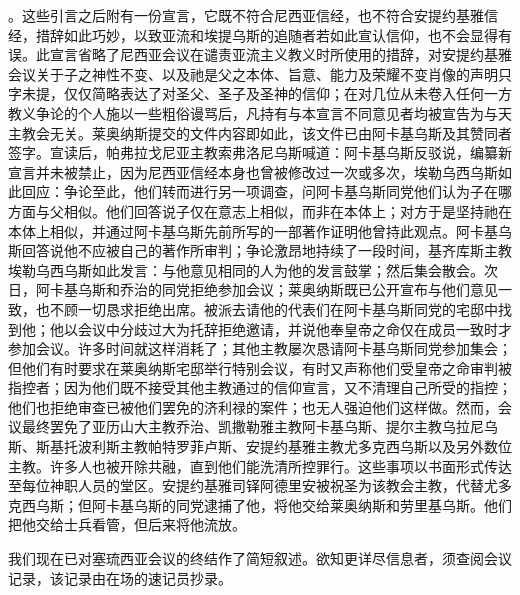。这些引言之后附有一份宣言，它既不符合尼西亚信经，也不符合安提约基雅信经，措辞如此巧妙，以致亚流和埃提乌斯的追随者若如此宣认信仰，也不会显得有误。此宣言省略了尼西亚会议在谴责亚流主义教义时所使用的措辞，对安提约基雅会议关于子之神性不变、以及祂是父之本体、旨意、能力及荣耀不变肖像的声明只字未提，仅仅简略表达了对圣父、圣子及圣神的信仰；在对几位从未卷入任何一方教义争论的个人施以一些粗俗谩骂后，凡持有与本宣言不同意见者均被宣告为与天主教会无关。莱奥纳斯提交的文件内容即如此，该文件已由阿卡基乌斯及其赞同者签字。宣读后，帕弗拉戈尼亚主教索弗洛尼乌斯喊道：阿卡基乌斯反驳说，编纂新宣言并未被禁止，因为尼西亚信经本身也曾被修改过一次或多次，埃勒乌西乌斯如此回应：争论至此，他们转而进行另一项调查，问阿卡基乌斯同党他们认为子在哪方面与父相似。他们回答说子仅在意志上相似，而非在本体上；对方于是坚持祂在本体上相似，并通过阿卡基乌斯先前所写的一部著作证明他曾持此观点。阿卡基乌斯回答说他不应被自己的著作所审判；争论激昂地持续了一段时间，基齐库斯主教埃勒乌西乌斯如此发言：与他意见相同的人为他的发言鼓掌；然后集会散会。次日，阿卡基乌斯和乔治的同党拒绝参加会议；莱奥纳斯既已公开宣布与他们意见一致，也不顾一切恳求拒绝出席。被派去请他的代表们在阿卡基乌斯同党的宅邸中找到他；他以会议中分歧过大为托辞拒绝邀请，并说他奉皇帝之命仅在成员一致时才参加会议。许多时间就这样消耗了；其他主教屡次恳请阿卡基乌斯同党参加集会；但他们有时要求在莱奥纳斯宅邸举行特别会议，有时又声称他们受皇帝之命审判被指控者；因为他们既不接受其他主教通过的信仰宣言，又不清理自己所受的指控；他们也拒绝审查已被他们罢免的济利禄的案件；也无人强迫他们这样做。然而，会议最终罢免了亚历山大主教乔治、凯撒勒雅主教阿卡基乌斯、提尔主教乌拉尼乌斯、斯基托波利斯主教帕特罗菲卢斯、安提约基雅主教尤多克西乌斯以及另外数位主教。许多人也被开除共融，直到他们能洗清所控罪行。这些事项以书面形式传达至每位神职人员的堂区。安提约基雅司铎阿德里安被祝圣为该教会主教，代替尤多克西乌斯；但阿卡基乌斯的同党逮捕了他，将他交给莱奥纳斯和劳里基乌斯。他们把他交给士兵看管，但后来将他流放。\par

我们现在已对塞琉西亚会议的终结作了简短叙述。欲知更详尽信息者，须查阅会议记录，该记录由在场的速记员抄录。\par

